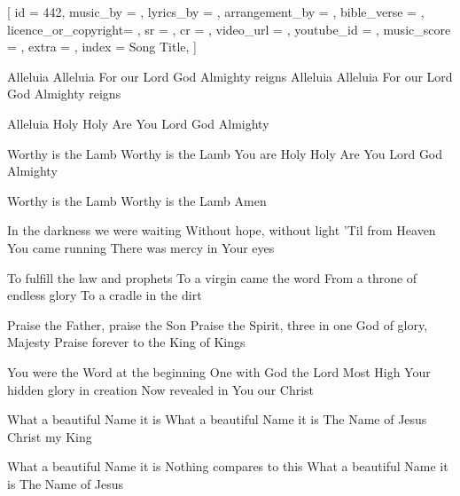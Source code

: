 [
    id                  = {442},
    music_by            = {}, %
    lyrics_by           = {}, %
    arrangement_by      = {}, %
    bible_verse         = {},
    licence_or_copyright= {},
    sr                  = {},
    cr                  = {},
    video_url           = {}, %
    youtube_id          = {}, %
    music_score         = {}, %
    extra               = {},
    index               = {Song Title},
]

\beginverse

Alleluia Alleluia
For our Lord God Almighty reigns
Alleluia Alleluia
For our Lord God Almighty reigns

Alleluia
Holy Holy
Are You Lord God Almighty

Worthy is the Lamb
Worthy is the Lamb
You are Holy
Holy
Are You Lord God Almighty

Worthy is the Lamb
Worthy is the Lamb
Amen

\endverse

\beginchorus

In the darkness we were waiting
Without hope, without light
'Til from Heaven You came running
There was mercy in Your eyes

To fulfill the law and prophets
To a virgin came the word
From a throne of endless glory
To a cradle in the dirt

Praise the Father, praise the Son
Praise the Spirit, three in one
God of glory, Majesty
Praise forever to the King of Kings


\endchorus

\beginverse

You were the Word at the beginning
One with God the Lord Most High
Your hidden glory in creation
Now revealed in You our Christ

What a beautiful Name it is
What a beautiful Name it is
The Name of Jesus Christ my King

What a beautiful Name it is
Nothing compares to this
What a beautiful Name it is
The Name of Jesus

